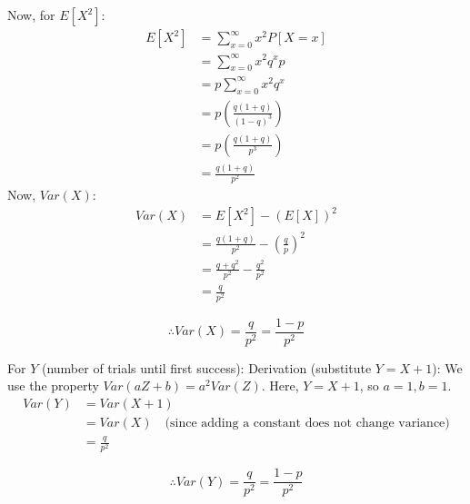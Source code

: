   Now, for \(E[X^2]\):
  \begin{align*}
    E[X^2] &= \sum_{x=0}^{\infty} x^2 P[X=x] \\
           &= \sum_{x=0}^{\infty} x^2 q^x p \\
           &= p \sum_{x=0}^{\infty} x^2 q^x \\
           &= p \left( \frac{q(1+q)}{(1-q)^3} \right) \\
           &= p \left( \frac{q(1+q)}{p^3} \right) \\
           &= \frac{q(1+q)}{p^2}
  \end{align*}
  Now, \(Var(X)\):
  \begin{align*}
    Var(X) &= E[X^2] - (E[X])^2 \\
           &= \frac{q(1+q)}{p^2} - \left(\frac{q}{p}\right)^2 \\
           &= \frac{q+q^2}{p^2} - \frac{q^2}{p^2} \\
           &= \frac{q}{p^2}
  \end{align*}

  \begin{equation}
    \label{eqn:variance-geometric-X}
    \boxed{\therefore Var(X) = \frac{q}{p^2} = \frac{1-p}{p^2}}
  \end{equation}

  For \(Y\) (number of trials until first success):
  Derivation (substitute \(Y=X+1\)):
  We use the property \(Var(aZ+b) = a^2 Var(Z)\).
  Here, \(Y = X+1\), so \(a=1, b=1\).
  \begin{align*}
    Var(Y) &= Var(X+1) \\
           &= Var(X) \quad \text{(since adding a constant does not change variance)} \\
           &= \frac{q}{p^2}
  \end{align*}

  \begin{equation}
    \label{eqn:variance-geometric-Y}
    \boxed{\therefore Var(Y) = \frac{q}{p^2} = \frac{1-p}{p^2}}
  \end{equation}

